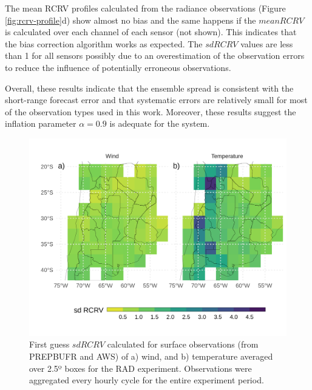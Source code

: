 \documentclass[final,5p,times,twocolumn,authoryear]{elsarticle} %
\begin{document}
The mean RCRV profiles calculated from the radiance observations (Figure \ref{fig:rcrv-profile}d) show almost no bias and the same happens if the \(mean RCRV\) is calculated over each channel of each sensor (not shown). This indicates that the bias correction algorithm works as expected. The \(sd RCRV\) values are less than 1 for all sensors possibly due to an overestimation of the observation errors to reduce the influence of potentially erroneous observations.

Overall, these results indicate that the ensemble spread is consistent with the short-range forecast error and that systematic errors are relatively small for most of the observation types used in this work. Moreover, these results suggest the inflation parameter \(\alpha = 0.9\) is adequate for the system.



\begin{figure}
\includegraphics[width=1\linewidth]{../figures/rcrv-sfc-1} \caption{First guess \(sd RCRV\) calculated for surface observations (from PREPBUFR and AWS) of a) wind, and b) temperature averaged over 2.5º boxes for the RAD experiment. Observations were aggregated every hourly cycle for the entire experiment period.}\label{fig:rcrv-sfc}
\end{figure}
\end{document}
